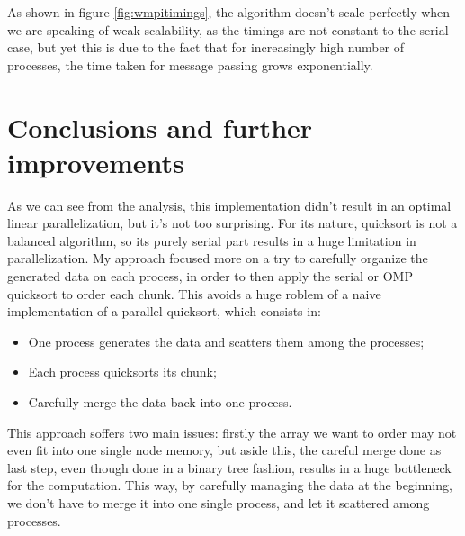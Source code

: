 \documentclass{article}
\begin{document}
	
	As shown in figure \ref{fig:wmpitimings}, the algorithm doesn't scale perfectly when we are speaking of weak scalability, as the timings are not constant to the serial case, but yet this is due to the fact that for increasingly high number of processes, the time taken for message passing grows exponentially. 
	
	\section{Conclusions and further improvements}
	
	As we can see from the analysis, this implementation didn't result in an optimal linear parallelization, but it's not too surprising.
	For its nature, quicksort is not a balanced algorithm, so its purely serial part results in a huge limitation in parallelization.
	My approach focused more on a try to carefully organize the generated data on each process, in order to then apply the serial or OMP quicksort to order each chunk. This avoids a huge roblem of a naive implementation of a parallel quicksort, which consists in:
	\begin{itemize}
		\item One process generates the data and scatters them among the processes;
		\item Each process quicksorts its chunk;
		\item Carefully merge the data back into one process.
	\end{itemize}
	This approach soffers two main issues: firstly the array we want to order may not even fit into one single node memory, but aside this, the careful merge done as last step, even though done in a binary tree fashion, results in a huge bottleneck for the computation. This way, by carefully managing the data at the beginning, we don't have to merge it into one single process, and let it scattered among processes.
	
\end{document}
